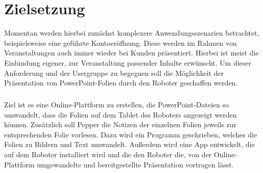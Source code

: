 \section{Zielsetzung}\label{sec:zielsetzung}
Momentan werden hierbei zunächst komplexere Anwendungsszenarien betrachtet,
beispielsweise eine geführte Kontoeröffnung. Diese werden im Rahmen von
Veranstaltungen auch immer wieder bei Kunden präsentiert. Hierbei ist meist die
Einbindung eigener, zur Veranstaltung passender Inhalte erwünscht. Um dieser
Anforderung und der Usergruppe zu begegnen soll die Möglichkeit der
Präsentation von PowerPoint-Folien durch den Roboter geschaffen werden.

\subparagraph{}
Ziel ist es eine Online-Plattform zu erstellen, die PowerPoint-Dateien so
umwandelt, dass die Folien auf dem Tablet des Roboters angezeigt werden können.
Zusätzlich soll Pepper die Notizen der einzelnen Folien jeweils zur
entsprechenden Folie vorlesen. Dazu wird ein Programm geschrieben, welches die
Folien zu Bildern und Text umwandelt. Außerdem wird eine App entwickelt, die auf
dem Roboter installiert wird und die den Roboter die, von der Online-Plattform
umgewandelte und bereitgestellte Präsentation vortragen lässt.
